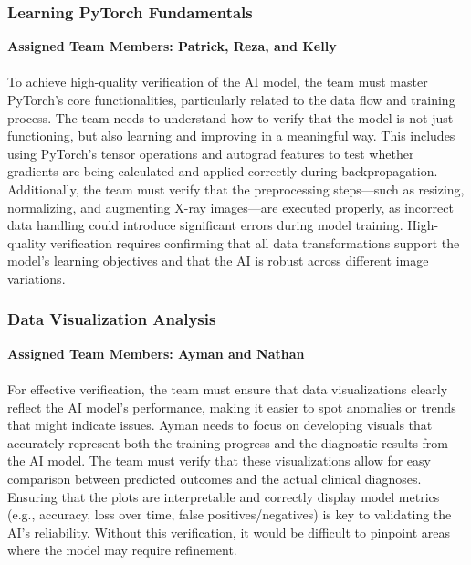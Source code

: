 \documentclass[12pt, titlepage]{article}
\begin{document}
\subsubsection{Learning PyTorch Fundamentals}
\textbf{Assigned Team Members: Patrick, Reza, and Kelly}\\\\
To achieve high-quality verification of the AI model, the team must master PyTorch’s core functionalities, particularly related to the data flow and training process. The team needs to understand how to verify that the model is not just functioning, but also learning and improving in a meaningful way. This includes using PyTorch’s tensor operations and autograd features to test whether gradients are being calculated and applied correctly during backpropagation. Additionally, the team must verify that the preprocessing steps—such as resizing, normalizing, and augmenting X-ray images—are executed properly, as incorrect data handling could introduce significant errors during model training. High-quality verification requires confirming that all data transformations support the model’s learning objectives and that the AI is robust across different image variations.
\subsubsection{Data Visualization Analysis}
\textbf{Assigned Team Members: Ayman and Nathan}\\\\ 
For effective verification, the team must ensure that data visualizations clearly reflect the AI model’s performance, making it easier to spot anomalies or trends that might indicate issues. Ayman needs to focus on developing visuals that accurately represent both the training progress and the diagnostic results from the AI model. The team must verify that these visualizations allow for easy comparison between predicted outcomes and the actual clinical diagnoses. Ensuring that the plots are interpretable and correctly display model metrics (e.g., accuracy, loss over time, false positives/negatives) is key to validating the AI’s reliability. Without this verification, it would be difficult to pinpoint areas where the model may require refinement.
\end{document}
